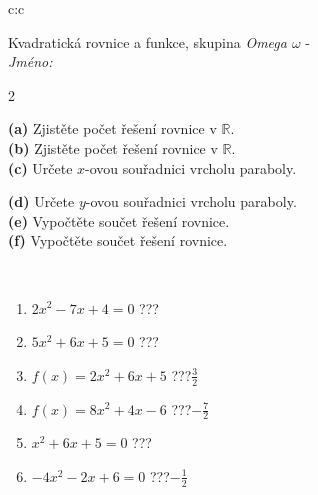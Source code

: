 \documentclass[10pt]{report}
\begin{document}
\begin{tabular}{c:c}
\begin{minipage}[c][104.5mm][t]{0.5\linewidth}
\begin{center}
\vspace{7mm}
{\huge \LARGE Kvadratická rovnice a funkce, skupina \textit{Omega $\omega$} -}\\[5mm]
\textit{Jméno:}\phantom{xxxxxxxxxxxxxxxxxxxxxxxxxxxxxxxxxxxxxxxxxxxxxxxxxxxxxxxxxxxxxxxxx}\\[5mm]
\begin{minipage}{0.95\linewidth}
\begin{center}
{\small \begin{multicols}{2} \raggedright
\textbf{(a)} Zjistěte počet řešení rovnice v \(\mathbb{R}\). \\[1mm]
\textbf{(b)} Zjistěte počet řešení rovnice v \(\mathbb{R}\). \\[1mm]
\textbf{(c)} Určete \(x\)-ovou souřadnici vrcholu paraboly. \par \columnbreak
\textbf{(d)} Určete \(y\)-ovou souřadnici vrcholu paraboly. \\[1mm]
\textbf{(e)} Vypočtěte součet řešení rovnice. \\[1mm]
\textbf{(f)} Vypočtěte součet řešení rovnice.
\end{multicols}
}
\end{center}
\end{minipage}
\\[4mm]
\begin{minipage}{0.79\linewidth}
\begin{center}
\begin{varwidth}{\linewidth}
\begin{enumerate}
\Large
\item $2x^2-7x+4=0$\quad \dotfill\; ???\;\dotfill {}
\item $5x^2+6x+5=0$\quad \dotfill\; ???\;\dotfill {}
\item $f(x)=2x^2+6x+5$\quad \dotfill\; ???\;\dotfill \quad $\frac{3}{2}$
\item $f(x)=8x^2+4x-6$\quad \dotfill\; ???\;\dotfill \quad $-\frac{7}{2}$
\item $x^2+6x+5=0$\quad \dotfill\; ???\;\dotfill {}
\item $-4x^2-2x+6=0$\quad \dotfill\; ???\;\dotfill \quad $-\frac{1}{2}$
\end{enumerate}
\end{varwidth}
\end{center}

\end{minipage}
\end{center}
\end{minipage}
\end{tabular}
\end{document}
